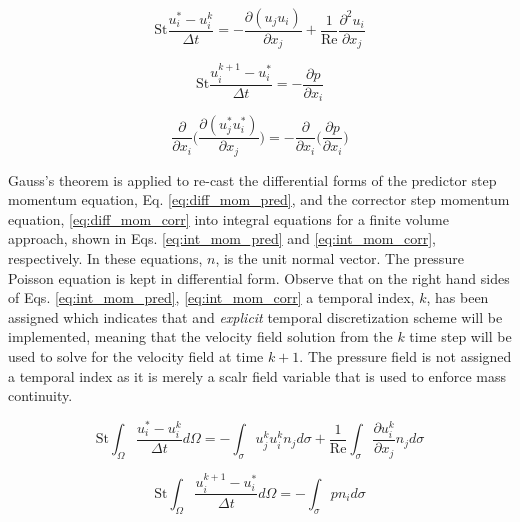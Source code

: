 \documentclass[10pt, letterpaper]{article}
\begin{document}
\begin{equation}
  \text{St}\frac{u_{i}^{*} - u_{i}^{k}}{\Delta{t}} = -\frac{\partial{(u_{j}u_{i})}}{\partial{x_{j}}} + \frac{1}{\text{Re}}\frac{\partial^{2}{u_{i}}}{\partial{x_{j}}}
  \label{eq:diff_mom_pred}
\end{equation}

\begin{equation}
  \text{St}\frac{u_{i}^{k+1} - u_{i}^{*}}{\Delta{t}} =  - \frac{\partial{p}}{\partial{x_{i}}}
  \label{eq:diff_mom_corr}
\end{equation}

\begin{equation}
  \boxed{
    \frac{\partial}{\partial{x_{i}}}\bigg(\frac{\partial(u_{j}^{*}u_{i}^{*})}{\partial{x_{j}}}\bigg) = - \frac{\partial}{\partial{x_{i}}}\bigg(\frac{\partial{p}}{\partial{x_{i}}}\bigg)
  }
  \label{eq:diff_press_poiss}
\end{equation}

Gauss's theorem is applied to re-cast the differential forms of the predictor step momentum equation, Eq. \ref{eq:diff_mom_pred}, and the corrector step momentum equation, \ref{eq:diff_mom_corr} into integral equations for a finite volume approach, shown in Eqs. \ref{eq:int_mom_pred} and \ref{eq:int_mom_corr}, respectively. In these equations, $n$, is the unit normal vector. The pressure Poisson equation is kept in differential form. Observe that on the right hand sides of Eqs. \ref{eq:int_mom_pred}, \ref{eq:int_mom_corr} a temporal index, $k$, has been assigned which indicates that and \textit{explicit} temporal discretization scheme will be implemented, meaning that the velocity field solution from the $k$ time step will be used to solve for the velocity field at time $k+1$. The pressure field is not assigned a temporal index as it is merely a scalr field variable that is used to enforce mass continuity. 

\begin{equation}
  \boxed{
    \text{St}\int_{\Omega}\frac{u_{i}^{*}-u_{i}^{k}}{\Delta{t}}d\Omega = -\int_{\sigma}u_{j}^{k}u_{i}^{k}n_{j}d\sigma + \frac{1}{\text{Re}}\int_{\sigma}\frac{\partial{u_{i}^{k}}}{\partial{x_{j}}}n_{j}d\sigma
  }
  \label{eq:int_mom_pred}
\end{equation}

\begin{equation}
  \boxed{
    \text{St}\int_{\Omega}\frac{u_{i}^{k+1}-u_{i}^{*}}{\Delta{t}}d\Omega = - \int_{\sigma}pn_{i}d\sigma
  }
  \label{eq:int_mom_corr}
\end{equation}
\end{document}
